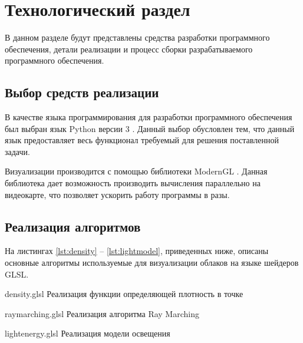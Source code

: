\chapter{Технологический раздел}

В данном разделе будут представлены средства разработки программного обеспечения, детали реализации и процесс сборки разрабатываемого
программного обеспечения.

\section{Выбор средств реализации}

В качестве языка программирования для разработки программного обеспечения был выбран язык Python версии 3 \cite{python}. Данный выбор обусловлен тем, что данный язык предоставляет весь функционал требуемый для решения поставленной задачи. 

Визуализации производится с помощью библиотеки ModernGL \cite{moderngl}. Данная библиотека дает возможность производить вычисления параллельно на видеокарте, что позволяет ускорить работу программы в разы. 


\section{Реализация алгоритмов}

На листингах \ref{lst:density} -- \ref{lst:lightmodel}, приведенных ниже, описаны основные алгоритмы используемые для визуализации облаков на языке шейдеров GLSL.



\clearpage

{density.glsl} %
{} %
{Реализация функции определяющей плотность в точке} %


\clearpage

{raymarching.glsl} %
{} %
{Реализация алгоритма Ray Marching} %


\clearpage

{lightenergy.glsl} %
{} %
{Реализация модели освещения} %





